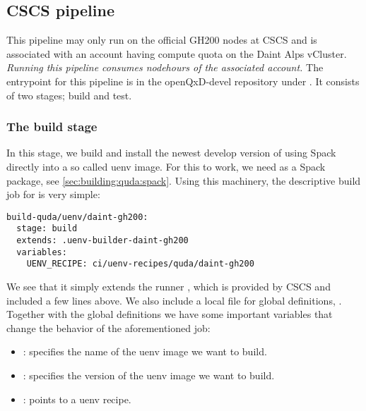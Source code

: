 
\subsection{CSCS pipeline}
\label{sec:cicd:pipeline:cscs}

This pipeline may only run on the official GH200 nodes at CSCS and is associated with an account having compute quota on the Daint Alps vCluster.
\emph{Running this pipeline consumes nodehours of the associated account.}
The entrypoint for this pipeline is in the openQxD-devel repository\cite{gitlab:openqxd-devel} under .
It consists of two stages; build and test.

\subsubsection{The build stage}

In this stage, we build and install the newest develop version of \quda using Spack\cite{Gamblin_The_Spack_Package_2015} directly into a so called uenv\cite{online:cscs:uenv} image.
For this to work, we need \quda as a Spack package, see \cref{sec:building:quda:spack}.
Using this machinery, the descriptive build job for \quda is very simple:
\begin{verbatim}
build-quda/uenv/daint-gh200:
  stage: build
  extends: .uenv-builder-daint-gh200
  variables:
    UENV_RECIPE: ci/uenv-recipes/quda/daint-gh200
\end{verbatim}
We see that it simply extends the runner , which is provided by CSCS and included a few lines above.
We also include a local file for global definitions, .
Together with the global definitions we have some important variables that change the behavior of the aforementioned job:
\begin{itemize}
  \item {}: specifies the name of the uenv image we want to build.
  \item {}: specifies the version of the uenv image we want to build.
  \item {}: points to a uenv recipe.
\end{itemize}

